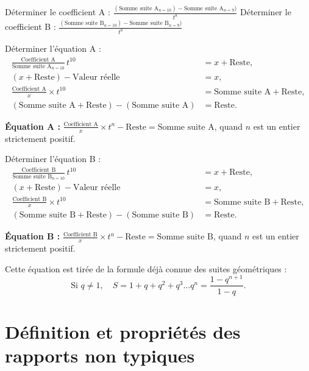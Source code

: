 \documentclass[11pt,a4paper]{article}
\begin{document}
Déterminer le coefficient A :
$\displaystyle \frac{(\text{Somme suite A}_{n=10}) - \text{Somme suite A}_{n=9})}{t^{8}}$ \quad
Déterminer le coefficient B :
$\displaystyle \frac{(\text{Somme suite B}_{n=10}) - \text{Somme suite B}_{n=9})}{t^{8}}$

Déterminer l'équation A :
\begin{align*}
\frac{\text{Coefficient A}}{\text{Somme suite A}_{n=10}}\,t^{10}
&=x+\text{Reste},\\
(x+\text{Reste})-\text{Valeur réelle}&=x,\\
\frac{\text{Coefficient A}}{x}\times t^{10}
&=\text{Somme suite A}+\text{Reste},\\
(\text{Somme suite A}+\text{Reste})-(\text{Somme suite A})
&=\text{Reste}.
\end{align*}

\textbf{Équation A :} $\displaystyle \frac{\text{Coefficient A}}{x} \times t^{n} - \text{Reste} = \text{Somme suite A}$,
quand $n$ est un entier strictement positif.

Déterminer l'équation B :
\begin{align*}
\frac{\text{Coefficient B}}{\text{Somme suite B}_{n=10}}\,t^{10}
&=x+\text{Reste},\\
(x+\text{Reste})-\text{Valeur réelle}&=x,\\
\frac{\text{Coefficient B}}{x}\times t^{10}
&=\text{Somme suite B}+\text{Reste},\\
(\text{Somme suite B}+\text{Reste})-(\text{Somme suite B})
&=\text{Reste}.
\end{align*}

\textbf{Équation B :} $\displaystyle \frac{\text{Coefficient B}}{x} \times t^{n} - \text{Reste} = \text{Somme suite B}$,
quand $n$ est un entier strictement positif.

\vspace{0.3cm}
\begin{boitenote}[Inspiration]
Cette équation est tirée de la formule déjà connue des suites géométriques :
\[
\text{Si } q \neq 1,\quad S = 1 + q + q^{2} + q^{3} \dots q^{n} = \frac{1 - q^{n+1}}{1 - q}.
\]
\end{boitenote}


\section{Définition et propriétés des rapports non typiques}
\end{document}
